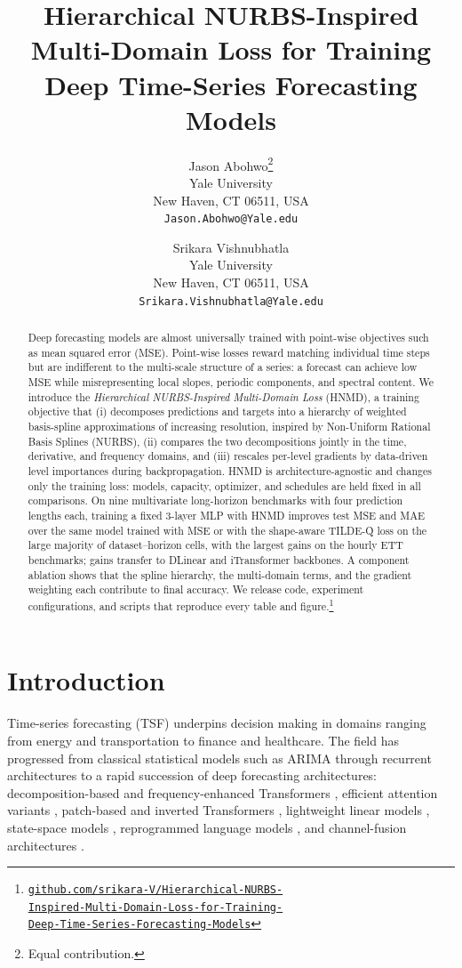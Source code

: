 \documentclass[11pt,twocolumn]{article}
\title{Hierarchical NURBS-Inspired Multi-Domain Loss for Training Deep Time-Series Forecasting Models}
\author{Jason Abohwo\thanks{Equal contribution.} \\
Yale University\\
New Haven, CT 06511, USA \\
\texttt{Jason.Abohwo@Yale.edu}\\
\and
Srikara Vishnubhatla\footnotemark[1] \\
Yale University\\
New Haven, CT 06511, USA \\
\texttt{Srikara.Vishnubhatla@Yale.edu}\\
}
\date{}
\newcommand{\methodName}{HNMD\xspace}
\begin{document}
\maketitle

\begin{abstract}
Deep forecasting models are almost universally trained with point-wise objectives such as mean squared error (MSE). Point-wise losses reward matching individual time steps but are indifferent to the multi-scale structure of a series: a forecast can achieve low MSE while misrepresenting local slopes, periodic components, and spectral content. We introduce the \emph{Hierarchical NURBS-Inspired Multi-Domain Loss} (\methodName), a training objective that (i) decomposes predictions and targets into a hierarchy of weighted basis-spline approximations of increasing resolution, inspired by Non-Uniform Rational Basis Splines (NURBS), (ii) compares the two decompositions jointly in the time, derivative, and frequency domains, and (iii) rescales per-level gradients by data-driven level importances during backpropagation. \methodName is architecture-agnostic and changes only the training loss: models, capacity, optimizer, and schedules are held fixed in all comparisons. On nine multivariate long-horizon benchmarks with four prediction lengths each, training a fixed 3-layer MLP with \methodName improves test MSE and MAE over the same model trained with MSE or with the shape-aware TILDE-Q loss on the large majority of dataset--horizon cells, with the largest gains on the hourly ETT benchmarks; gains transfer to DLinear and iTransformer backbones. A component ablation shows that the spline hierarchy, the multi-domain terms, and the gradient weighting each contribute to final accuracy. We release code, experiment configurations, and scripts that reproduce every table and figure.\footnote{\href{https://github.com/srikara-V/Hierarchical-NURBS-Inspired-Multi-Domain-Loss-for-Training-Deep-Time-Series-Forecasting-Models}{\texttt{github.com/srikara-V/Hierarchical-NURBS-}\\\texttt{Inspired-Multi-Domain-Loss-for-Training-}\\\texttt{Deep-Time-Series-Forecasting-Models}}}
\end{abstract}

\section{Introduction}
\label{sec:intro}

Time-series forecasting (TSF) underpins decision making in domains ranging from energy and transportation to finance and healthcare. The field has progressed from classical statistical models such as ARIMA \citep{arima} through recurrent architectures \citep{lstm,gru} to a rapid succession of deep forecasting architectures: decomposition-based and frequency-enhanced Transformers \citep{autoformer,fedformer}, efficient attention variants \citep{informer,reformer,flowformer}, patch-based and inverted Transformers \citep{patchtst,itransformer}, lightweight linear models \citep{dlinear,rlinear,tide}, state-space models \citep{timemachine}, reprogrammed language models \citep{TimeLLM}, and channel-fusion architectures \citep{softs}.
\end{document}
